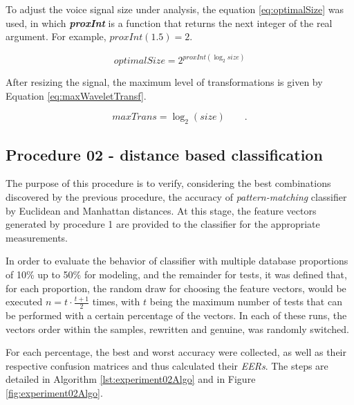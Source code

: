 			\par To adjust the voice signal size under analysis, the equation \ref{eq:optimalSize} was used, in which \textit{\textbf{proxInt}} is a function that returns the next integer of the real argument. For example, $proxInt(1.5)=2$.

			\begin{equation}
				optimalSize=2^{proxInt(\log_{2}size)}
				\label{eq:optimalSize}
			\end{equation} 
			
			\par After resizing the signal, the maximum level of transformations is given by Equation \ref{eq:maxWaveletTransf}. 
			
			\begin{equation}
				maxTrans=\log_{2}(size) \qquad.
				\label{eq:maxWaveletTransf}
			\end{equation}
			
		\subsection{Procedure 02 - distance based classification}
			\label{sec:propApproach:subsec:Experiment2}
			\par The purpose of this procedure is to verify, considering the best combinations discovered by the previous procedure, the accuracy of \textit{pattern-matching} classifier by Euclidean and Manhattan distances. At this stage, the feature vectors generated by procedure 1 are provided to the classifier for the appropriate measurements.
			
			\par In order to evaluate the behavior of classifier with multiple database proportions of 10\% up to 50\% for modeling, and the remainder for tests, it was defined that, for each proportion, the random draw for choosing the feature vectors, would be executed $n=t\cdot\frac{t+1}{2}$ times, with $t$ being the maximum number of tests that can be performed with a certain percentage of the vectors. In each of these runs, the vectors order within the samples, rewritten and genuine, was randomly switched.
			
			\par For each percentage, the best and worst accuracy were collected, as well as their respective confusion matrices and thus calculated their \textit{EERs}. The steps are detailed in Algorithm \ref{lst:experiment02Algo} and in Figure \ref{fig:experiment02Algo}.
	
